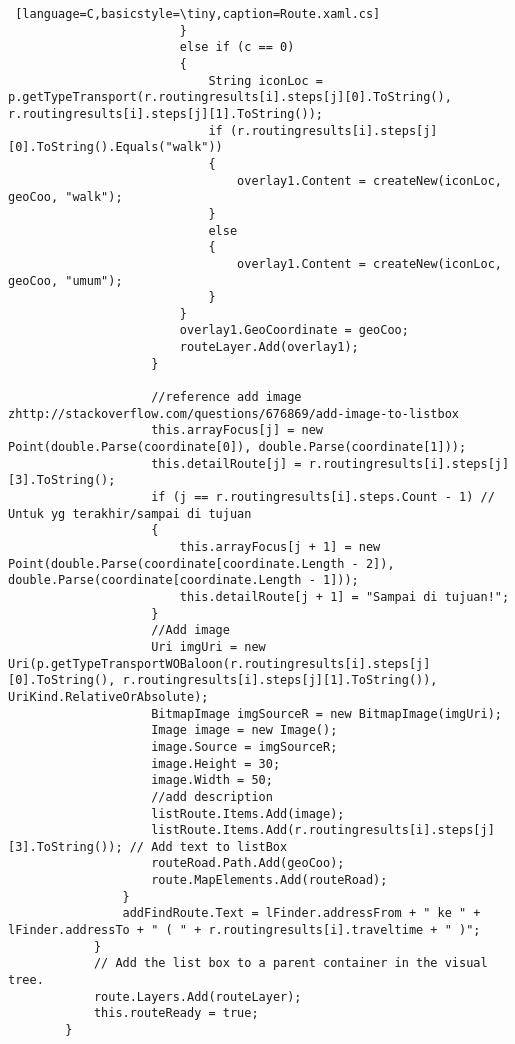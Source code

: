 \begin{lstlisting} [language=C,basicstyle=\tiny,caption=Route.xaml.cs]
                        }
                        else if (c == 0)
                        {
                            String iconLoc = p.getTypeTransport(r.routingresults[i].steps[j][0].ToString(), r.routingresults[i].steps[j][1].ToString());
                            if (r.routingresults[i].steps[j][0].ToString().Equals("walk"))
                            {
                                overlay1.Content = createNew(iconLoc, geoCoo, "walk");
                            }
                            else
                            {
                                overlay1.Content = createNew(iconLoc, geoCoo, "umum");
                            }
                        }
                        overlay1.GeoCoordinate = geoCoo;
                        routeLayer.Add(overlay1);
                    }

                    //reference add image zhttp://stackoverflow.com/questions/676869/add-image-to-listbox
                    this.arrayFocus[j] = new Point(double.Parse(coordinate[0]), double.Parse(coordinate[1]));
                    this.detailRoute[j] = r.routingresults[i].steps[j][3].ToString();
                    if (j == r.routingresults[i].steps.Count - 1) // Untuk yg terakhir/sampai di tujuan
                    {
                        this.arrayFocus[j + 1] = new Point(double.Parse(coordinate[coordinate.Length - 2]), double.Parse(coordinate[coordinate.Length - 1]));
                        this.detailRoute[j + 1] = "Sampai di tujuan!";
                    }
                    //Add image 
                    Uri imgUri = new Uri(p.getTypeTransportWOBaloon(r.routingresults[i].steps[j][0].ToString(), r.routingresults[i].steps[j][1].ToString()), UriKind.RelativeOrAbsolute);
                    BitmapImage imgSourceR = new BitmapImage(imgUri);
                    Image image = new Image();
                    image.Source = imgSourceR;
                    image.Height = 30;
                    image.Width = 50;
                    //add description
                    listRoute.Items.Add(image);
                    listRoute.Items.Add(r.routingresults[i].steps[j][3].ToString()); // Add text to listBox
                    routeRoad.Path.Add(geoCoo);
                    route.MapElements.Add(routeRoad);
                }
                addFindRoute.Text = lFinder.addressFrom + " ke " + lFinder.addressTo + " ( " + r.routingresults[i].traveltime + " )";
            }
            // Add the list box to a parent container in the visual tree.
            route.Layers.Add(routeLayer);
            this.routeReady = true;
        }


\end{lstlisting}
